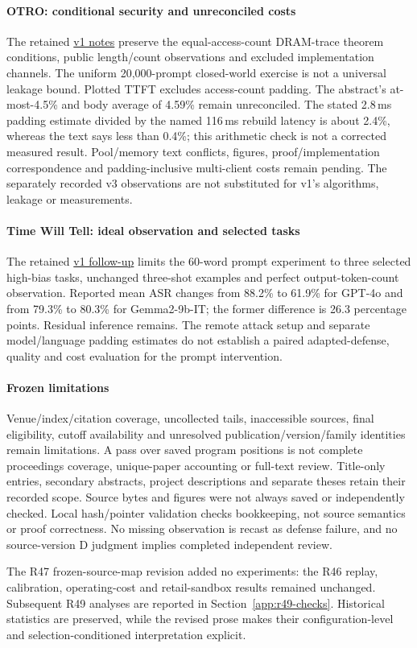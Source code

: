 \paragraph{OTRO: conditional security and unreconciled costs}
The retained \href{https://arxiv.org/html/2606.17358v1}{v1 notes} preserve the equal-access-count DRAM-trace theorem conditions, public length/count observations and excluded implementation channels. The uniform 20,000-prompt closed-world exercise is not a universal leakage bound. Plotted TTFT excludes access-count padding. The abstract's at-most-4.5\% and body average of 4.59\% remain unreconciled. The stated 2.8\,ms padding estimate divided by the named 116\,ms rebuild latency is about 2.4\%, whereas the text says less than 0.4\%; this arithmetic check is not a corrected measured result. Pool/memory text conflicts, figures, proof/implementation correspondence and padding-inclusive multi-client costs remain pending. The separately recorded v3 observations are not substituted for v1's algorithms, leakage or measurements.

\paragraph{Time Will Tell: ideal observation and selected tasks}
The retained \href{https://arxiv.org/html/2412.15431v1}{v1 follow-up} limits the 60-word prompt experiment to three selected high-bias tasks, unchanged three-shot examples and perfect output-token-count observation. Reported mean ASR changes from 88.2\% to 61.9\% for GPT-4o and from 79.3\% to 80.3\% for Gemma2-9b-IT; the former difference is 26.3 percentage points. Residual inference remains. The remote attack setup and separate model/language padding estimates do not establish a paired adapted-defense, quality and cost evaluation for the prompt intervention.

\paragraph{Frozen limitations}
Venue/index/citation coverage, uncollected tails, inaccessible sources, final eligibility, cutoff availability and unresolved publication/version/family identities remain limitations. A pass over saved program positions is not complete proceedings coverage, unique-paper accounting or full-text review. Title-only entries, secondary abstracts, project descriptions and separate theses retain their recorded scope. Source bytes and figures were not always saved or independently checked. Local hash/pointer validation checks bookkeeping, not source semantics or proof correctness. No missing observation is recast as defense failure, and no source-version D judgment implies completed independent review.

The R47 frozen-source-map revision added no experiments: the R46 replay, calibration, operating-cost and retail-sandbox results remained unchanged. Subsequent R49 analyses are reported in Section~\ref{app:r49-checks}. Historical statistics are preserved, while the revised prose makes their configuration-level and selection-conditioned interpretation explicit.
